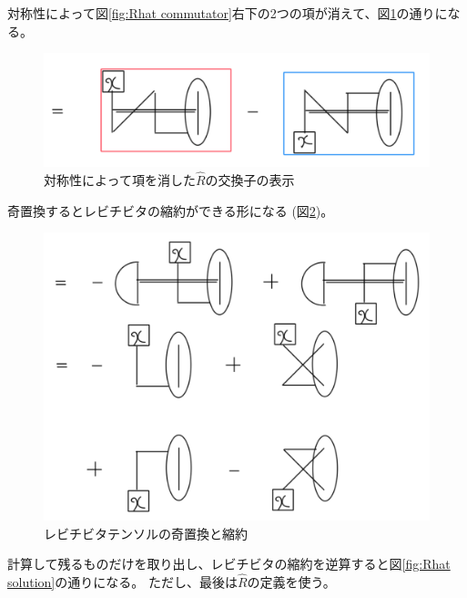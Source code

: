 \documentclass{jsarticle}
\begin{document}
対称性によって図\ref{fig:Rhat commutator}右下の2つの項が消えて、図\ref*{fig:Rhat symmmetry}の通りになる。

\begin{figure}
    \centering
    \includegraphics{Rhat-symmmetry.png}
    \caption[]{対称性によって項を消した$\hat{R}$の交換子の表示}
    \label{fig:Rhat symmmetry}
\end{figure}

奇置換するとレビチビタの縮約ができる形になる (図\ref*{fig:Rhat odd replace})。

\begin{figure}
    \centering
    \includegraphics{Rhat-odd-replace.png}
    \caption{レビチビタテンソルの奇置換と縮約}
    \label{fig:Rhat odd replace}
\end{figure}

計算して残るものだけを取り出し、レビチビタの縮約を逆算すると図\ref*{fig:Rhat solution}の通りになる。
ただし、最後は$\hat{R}$の定義を使う。
\end{document}
